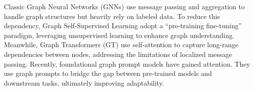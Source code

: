 
Classic Graph Neural Networks (GNNs) \cite{gcn, graphsage, gat, gin} use message passing and aggregation to handle graph structures but heavily rely on labeled data. To reduce this dependency, Graph Self-Supervised Learning \cite{you2020graphcl, dgi, hou2022graphmae} adopt a “pre-training fine-tuning” paradigm, leveraging unsupervised learning to enhance graph understanding. Meanwhile, Graph Transformers (GT) \cite{graphormer, graphbert} use self-attention to capture long-range dependencies between nodes, addressing the limitations of localized message passing. Recently, foundational graph prompt models \cite{ofa, huang2024prodigy, sun2023allinone} have gained attention. They use graph prompts to bridge the gap between pre-trained models and downstream tasks, ultimately improving adaptability.



